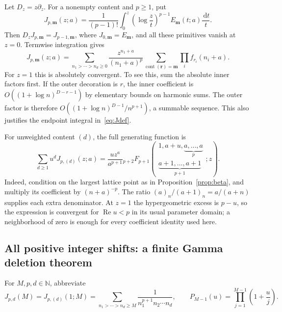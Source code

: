 \documentclass[11pt,oneside]{article}
\numberwithin{equation}{section}
\theoremstyle{definition}
\theoremstyle{remark}
\DeclareMathOperator{\Rea}{Re}
\DeclareMathOperator{\cont}{cont}
\newcommand{\dd}{\,\mathrm d}
\newcommand{\N}{\mathbb N}
\newcommand{\mm}{\mathbf m}
\begin{document}
Let $D_z=z\partial_z$. For a nonempty content and $p\ge1$, put
\begin{equation}\label{eq:Jdef}
J_{p,\mm}(z;a)=\frac1{(p-1)!}
 \int_0^z\left(\log\frac zt\right)^{p-1}E_{\mm}(t;a)\frac{\dd t}{t}.
\end{equation}
Then $D_zJ_{p,\mm}=J_{p-1,\mm}$, where $J_{0,\mm}=E_{\mm}$, and all these
primitives vanish at $z=0$. Termwise integration gives
\begin{equation}\label{eq:Jseries}
J_{p,\mm}(z;a)=\sum_{n_1>\cdots>n_d\ge0}
 \frac{z^{n_1+a}}{(n_1+a)^p}
 \sum_{\cont(\mathbf r)=\mm}\prod_i f_{r_i}(n_i+a).
\end{equation}
For $z=1$ this is absolutely convergent. To see this, sum the absolute inner
factors first. If the outer decoration is $r$, the inner coefficient is
$O((1+\log n)^{D-r-1})$ by elementary bounds on harmonic sums. The outer
factor is therefore $O((1+\log n)^{D-1}/n^{p+1})$, a summable sequence.
This also justifies the endpoint integral in~\eqref{eq:Jdef}.

For unweighted content $(d)$, the full generating function is
\begin{equation}\label{eq:Jhyper}
\sum_{d\ge1}u^dJ_{p,(d)}(z;a)
=\frac{u z^a}{a^{p+1}}
 {}_{p+2}F_{p+1}\!\left(
 \begin{matrix}1,a+u,\underbrace{a,\ldots,a}_{p}\\
               \underbrace{a+1,\ldots,a+1}_{p+1}\end{matrix};z\right).
\end{equation}
Indeed, condition on the largest lattice point as in
Proposition~\ref{prop:beta}, and multiply its coefficient by $(n+a)^{-p}$.
The ratio $(a)_n/(a+1)_n=a/(a+n)$ supplies each extra denominator.
At $z=1$ the hypergeometric excess is $p-u$, so the expression is convergent
for $\Rea u<p$ in its usual parameter domain; a neighborhood of zero is enough
for every coefficient identity used here.

\subsection{All positive integer shifts: a finite Gamma deletion theorem}

For $M,p,d\in\N$, abbreviate
\[
J_{p,d}(M)=J_{p,(d)}(1;M)
=\sum_{n_1>\cdots>n_d\ge M}
 \frac1{n_1^{p+1}n_2\cdots n_d},\qquad
P_{M-1}(u)=\prod_{j=1}^{M-1}\left(1+\frac uj\right).
\]
\end{document}

